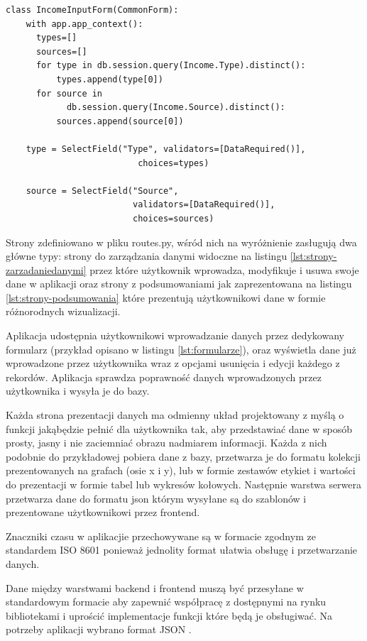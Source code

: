 \documentclass[a4paper,10pt, twoside]{report}
\begin{document}
\begin{large}
\begin{minipage}{\textwidth}
\begin{lstlisting}
class IncomeInputForm(CommonForm):
    with app.app_context():
      types=[]
      sources=[]
      for type in db.session.query(Income.Type).distinct():
          types.append(type[0])
      for source in 
            db.session.query(Income.Source).distinct():
          sources.append(source[0])

    type = SelectField("Type", validators=[DataRequired()],
                          choices=types)
    
    source = SelectField("Source", 
                         validators=[DataRequired()],
                         choices=sources)\end{lstlisting}
\end{minipage}

{Strony zdefiniowano w pliku routes.py, wśród nich na wyróżnienie zasługują dwa 
główne typy: strony do zarządzania danymi widoczne na listingu 
\ref*{lst:strony-zarzadaniedanymi} przez które użytkownik wprowadza, modyfikuje 
i usuwa swoje dane w aplikacji oraz strony z podsumowaniami jak zaprezentowana 
na listingu \ref*{lst:strony-podsumowania} które prezentują użytkownikowi dane w
 formie różnorodnych wizualizacji.}

{Aplikacja udostępnia użytkownikowi wprowadzanie danych przez dedykowany 
formularz (przykład opisano w listingu \ref*{lst:formularze}), oraz wyświetla 
dane już wprowadzone przez użytkownika wraz z opcjami usunięcia i edycji każdego
z rekordów. Aplikacja sprawdza poprawność danych wprowadzonych przez 
użytkownika i wysyła je do bazy.}

{Każda strona prezentacji danych ma odmienny układ projektowany z myślą o 
funkcji jakąbędzie pełnić dla użytkownika tak, aby przedstawiać dane w sposób 
prosty, jasny i nie zaciemniać obrazu nadmiarem informacji. Każda z nich 
podobnie do przykładowej pobiera dane z bazy, przetwarza je do formatu kolekcji 
prezentowanych na grafach (osie x i y), lub w formie zestawów etykiet i wartości
do prezentacji w formie tabel lub wykresów kołowych. Następnie warstwa 
serwera przetwarza dane do formatu json \cite{JSON} którym wysyłane są do 
szablonów i prezentowane użytkownikowi przez frontend.}

{Znaczniki czasu w aplikacjie przechowywane są w formacie zgodnym ze standardem 
ISO 8601 \cite{ISO 8601} ponieważ jednolity format ułatwia obsługę i 
przetwarzanie danych.}

{Dane między warstwami backend i frontend muszą być przesyłane w standardowym 
formacie aby zapewnić współpracę z dostępnymi na rynku bibliotekami i uprościć 
implementacje funkcji które będą je obsługiwać. Na potrzeby aplikacji wybrano 
format JSON \cite{JSON}.}


\end{large}
\end{document}
